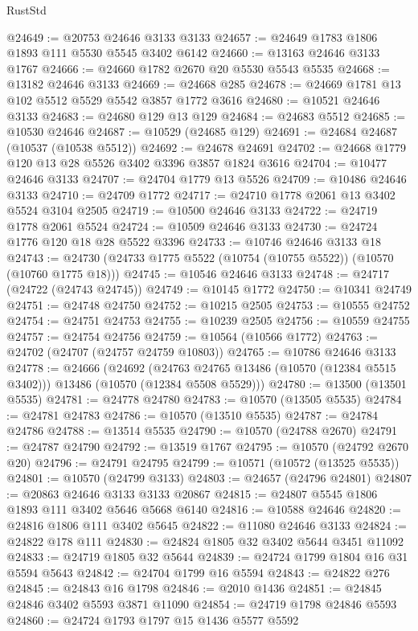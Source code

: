 \begin{lexlean}{RustStd}
\begin{coremodule}
@24649 := @20753 @24646 @3133 @3133
@24657 := @24649 @1783 @1806 @1893 @111 @5530 @5545 @3402 @6142
@24660 := @13163 @24646 @3133 @1767
@24666 := @24660 @1782 @2670 @20 @5530 @5543 @5535
@24668 := @13182 @24646 @3133
@24669 := @24668 @285
@24678 := @24669 @1781 @13 @102 @5512 @5529 @5542 @3857 @1772 @3616
@24680 := @10521 @24646 @3133
@24683 := @24680 @129 @13 @129
@24684 := @24683 @5512
@24685 := @10530 @24646
@24687 := @10529 (@24685 @129)
@24691 := @24684 @24687 (@10537 (@10538 @5512))
@24692 := @24678 @24691
@24702 := @24668 @1779 @120 @13 @28 @5526 @3402 @3396 @3857 @1824 @3616
@24704 := @10477 @24646 @3133
@24707 := @24704 @1779 @13 @5526
@24709 := @10486 @24646 @3133
@24710 := @24709 @1772
@24717 := @24710 @1778 @2061 @13 @3402 @5524 @3104 @2505
@24719 := @10500 @24646 @3133
@24722 := @24719 @1778 @2061 @5524
@24724 := @10509 @24646 @3133
@24730 := @24724 @1776 @120 @18 @28 @5522 @3396
@24733 := @10746 @24646 @3133 @18
@24743 := @24730 (@24733 @1775 @5522 (@10754 (@10755 @5522)) (@10570 (@10760 @1775 @18)))
@24745 := @10546 @24646 @3133
@24748 := @24717 (@24722 (@24743 @24745))
@24749 := @10145 @1772
@24750 := @10341 @24749
@24751 := @24748 @24750
@24752 := @10215 @2505
@24753 := @10555 @24752
@24754 := @24751 @24753
@24755 := @10239 @2505
@24756 := @10559 @24755
@24757 := @24754 @24756
@24759 := @10564 (@10566 @1772)
@24763 := @24702 (@24707 (@24757 @24759 @10803))
@24765 := @10786 @24646 @3133
@24778 := @24666
    (@24692
      (@24763 @24765 @13486 (@10570 (@12384 @5515 @3402)))
      @13486
      (@10570 (@12384 @5508 @5529)))
@24780 := @13500 (@13501 @5535)
@24781 := @24778 @24780
@24783 := @10570 (@13505 @5535)
@24784 := @24781 @24783
@24786 := @10570 (@13510 @5535)
@24787 := @24784 @24786
@24788 := @13514 @5535
@24790 := @10570 (@24788 @2670)
@24791 := @24787 @24790
@24792 := @13519 @1767
@24795 := @10570 (@24792 @2670 @20)
@24796 := @24791 @24795
@24799 := @10571 (@10572 (@13525 @5535))
@24801 := @10570 (@24799 @3133)
@24803 := @24657 (@24796 @24801)
@24807 := @20863 @24646 @3133 @3133 @20867
@24815 := @24807 @5545 @1806 @1893 @111 @3402 @5646 @5668 @6140
@24816 := @10588 @24646
@24820 := @24816 @1806 @111 @3402 @5645
@24822 := @11080 @24646 @3133
@24824 := @24822 @178 @111
@24830 := @24824 @1805 @32 @3402 @5644 @3451 @11092
@24833 := @24719 @1805 @32 @5644
@24839 := @24724 @1799 @1804 @16 @31 @5594 @5643
@24842 := @24704 @1799 @16 @5594
@24843 := @24822 @276
@24845 := @24843 @16 @1798
@24846 := @2010 @1436
@24851 := @24845 @24846 @3402 @5593 @3871 @11090
@24854 := @24719 @1798 @24846 @5593
@24860 := @24724 @1793 @1797 @15 @1436 @5577 @5592

\end{coremodule}
\end{lexlean}
